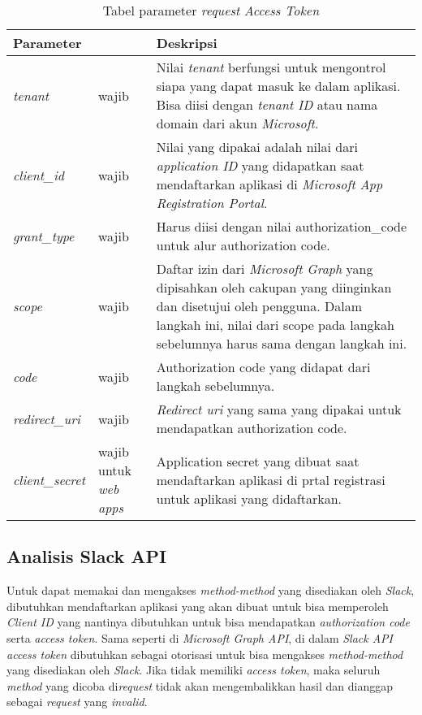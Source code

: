 \begin{table}[H]
	\centering 
	\caption{Tabel parameter \textit{request} \textit{Access Token}}
	\label{tab:parameter_request_access_token}
	\begin{tabular}{|p{3cm}|p{3cm}|p{9cm}|}
	\toprule
	 \textbf{Parameter} & & \textbf{Deskripsi}\\ \hline 
	\textit{tenant} & wajib & Nilai \textit{tenant} berfungsi untuk mengontrol siapa yang dapat masuk ke dalam aplikasi. Bisa diisi dengan \textit{tenant ID} atau nama domain dari akun \textit{Microsoft}.\\ \hline 
	\textit{client\_id} & wajib & Nilai yang dipakai adalah nilai dari \textit{application ID} yang didapatkan saat mendaftarkan aplikasi di \textit{Microsoft App Registration Portal}.\\ \hline 
	\textit{grant\_type} & wajib & Harus diisi dengan nilai authorization\_code untuk alur authorization code. \\ \hline
	\textit{scope} & wajib & Daftar izin dari \textit{Microsoft Graph} yang dipisahkan oleh cakupan yang diinginkan dan disetujui oleh pengguna. Dalam langkah ini, nilai dari scope pada langkah sebelumnya harus sama dengan langkah ini.  \\ \hline 
	\textit{code} & wajib & Authorization code yang didapat dari langkah sebelumnya. \\ \hline  
	\textit{redirect\_uri} & wajib & \textit{Redirect uri} yang sama yang dipakai untuk mendapatkan authorization code. \\ \hline 
	\textit{client\_secret} & wajib untuk \textit{web apps} & Application secret yang dibuat saat mendaftarkan aplikasi di prtal registrasi untuk aplikasi yang didaftarkan.
	\bottomrule
	\end{tabular}  
\end{table}

\subsection{Analisis Slack API}
Untuk dapat memakai dan mengakses \textit{method-method} yang disediakan oleh \textit{Slack}, dibutuhkan mendaftarkan aplikasi yang akan dibuat untuk bisa memperoleh \textit{Client ID} yang nantinya dibutuhkan untuk bisa mendapatkan \textit{authorization code} serta \textit{access token}. Sama seperti di \textit{Microsoft Graph API}, di dalam \textit{Slack API access token} dibutuhkan sebagai otorisasi untuk bisa mengakses \textit{method-method} yang disediakan oleh \textit{Slack}. Jika tidak memiliki \textit{access token}, maka seluruh \textit{method} yang dicoba di\textit{request} tidak akan mengembalikkan hasil dan dianggap sebagai \textit{request} yang \textit{invalid}. 

